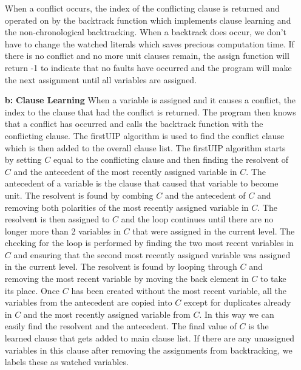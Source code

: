\documentclass[9pt]{extarticle}
\begin{document}
\begin{homeworkProblem}[Implementation]
\begin{enumerate}
            When a conflict occurs, the index of the conflicting clause is returned and operated on by the 
            backtrack function which implements clause learning and the non-chronological backtracking. When a 
            backtrack does occur, we don't have to change the watched literals which saves precious computation time. 
            If there is no conflict and no more unit clauses remain, the assign function will return -1 to indicate 
            that no faults have occurred and the program will make the next assignment until all variables are 
            assigned.

        \item[\textbf{b:}] \textbf{Clause Learning}
            When a variable is assigned and it causes a conflict, the index to the clause that had the conflict is
            returned. The program then knows that a conflict has occurred and calls the backtrack function with the
            conflicting clause. The firstUIP algorithm is used to find the conflict clause which is then added to the
            overall clause list.  The firstUIP algorithm starts by setting $C$ equal to the conflicting clause
            and then finding the resolvent of $C$ and the antecedent of the most recently
            assigned variable in $C$. The antecedent of a variable is the clause that caused that variable to 
            become unit. The resolvent is found by combing $C$ and the antecedent of $C$ and removing both polarities
            of the most recently assigned variable in $C$. The resolvent is then assigned to $C$ and the loop 
            continues until there are no longer more than 2 variables in $C$ that were assigned in the current level.
            The checking for the loop is performed by finding the two most recent variables in $C$ and ensuring that
            the second most recently assigned variable was assigned in the current level. The resolvent is found
            by looping through $C$ and removing the most recent variable by moving the back element in $C$ to take
            its place. Once $C$ has been created without the most recent variable, all the variables from the
            antecedent are copied into $C$ except for duplicates already in $C$ and the most recently assigned 
            variable from $C$. In this way we can easily find the resolvent and the antecedent. The final value
            of $C$ is the learned clause that gets added to main clause list. If there are any unassigned variables
            in this clause after removing the assignments from backtracking, we labels these as watched variables.


\end{enumerate}
\end{homeworkProblem}
\end{document}
